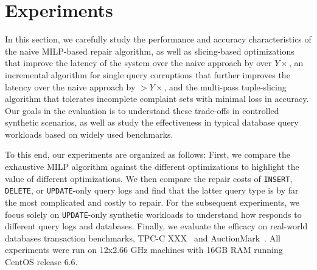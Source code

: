 
%
%
%
%
%
\section{Experiments}
\label{sec:experiments}



In this section, we carefully study the performance and accuracy
characteristics of the naive MILP-based repair algorithm, as well as 
slicing-based optimizations that improve the latency of the system over the naive
approach by over $Y\times$, an incremental algorithm for single query corruptions that
further improves the latency over the naive approach by $>Y\times$, and 
the multi-pass tuple-slicing algorithm that tolerates incomplete complaint sets with minimal loss in accuracy.
Our goals in the evaluation is to understand these trade-offs in
controlled synthetic scenarios, as well as study the effectiveness
in typical database query workloads based on widely used benchmarks.

To this end, our experiments are organized as follows: First, 
we compare the exhaustive MILP algorithm against the different optimizations 
to highlight the value of different optimizations.  We then compare the
repair costs of \texttt{INSERT}, \texttt{DELETE}, or \texttt{UPDATE}-only query logs 
and find that the latter query type is by far the most complicated and costly to repair.
For the subsequent experiments, we focus solely on \texttt{UPDATE}-only synthetic workloads 
to understand how \sys responds to different query logs and databases.  
Finally, we evaluate the efficacy on real-world databases transaction benchmarks,
TPC-C XXX~\cite{tpcc} and AuctionMark~\cite{auctionmark}.
All experiments were run on 12x2.66 GHz  machines with 16GB RAM running CentOS release 6.6.







